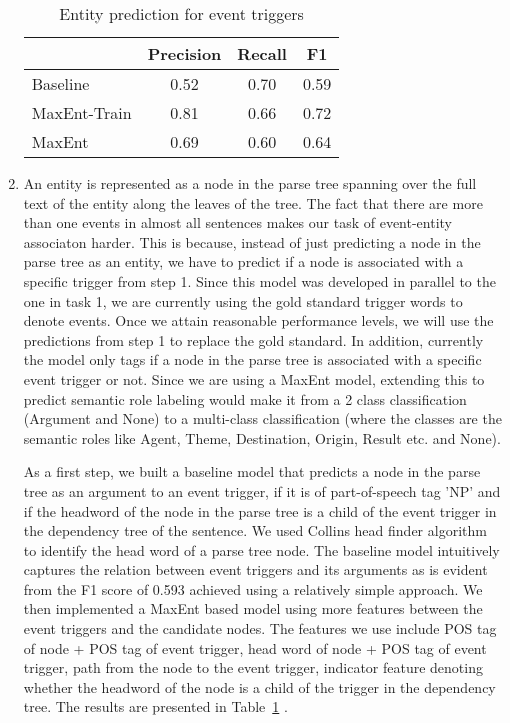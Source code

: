 \begin{enumerate}
\begin{table}
\centering
\begin{tabular}{|l||c|c|c|} \hline
&\textbf{Precision} & \textbf{Recall} & \textbf{F1} \\ \hline
\hline
Baseline&0.52&0.70&0.59\\
MaxEnt-Train&0.81&0.66&0.72\\
MaxEnt&0.69&0.60&0.64\\
\hline
\end{tabular}
\caption{Entity prediction for event triggers}
\label{table:entityprediction}
\end{table}

\item {} An entity is represented as a node in the parse tree spanning over the full text of the entity along the leaves of the tree. The fact that there are more than one events in almost all sentences makes our task of event-entity associaton harder. This is because, instead of just predicting a node in the parse tree as an entity, we have to predict if a node is associated with a specific trigger from step 1. Since this model was developed in parallel to the one in task 1, we are currently using the gold standard trigger words to denote events. Once we attain reasonable performance levels, we will use the predictions from step 1 to replace the gold standard. In addition, currently the model only tags if a node in the parse tree is associated with a specific event trigger or not. Since we are using a MaxEnt model, extending this to predict semantic role labeling would make it from a 2 class classification (Argument and None) to a multi-class classification (where the classes are the semantic roles like Agent, Theme, Destination, Origin, Result etc. and None).

As a first step, we built a baseline model that predicts a node in the parse tree as an argument to an event trigger, if it is of part-of-speech tag 'NP' and if the headword of the node in the parse tree is a child of the event trigger in the dependency tree of the sentence. We used Collins head finder algorithm to identify the head word of a parse tree node. The baseline model intuitively captures the relation between event triggers and its arguments as is evident from the F1 score of 0.593 achieved using a relatively simple approach. We then implemented a MaxEnt based model using more features between the event triggers and the candidate nodes. The features we use include POS tag of node + POS tag of event trigger, head word of node + POS tag of event trigger, path from the node to the event trigger, indicator feature denoting whether the headword of the node is a child of the trigger in the dependency tree. The results are presented in Table~\ref{table:entityprediction} .


\end{enumerate}
